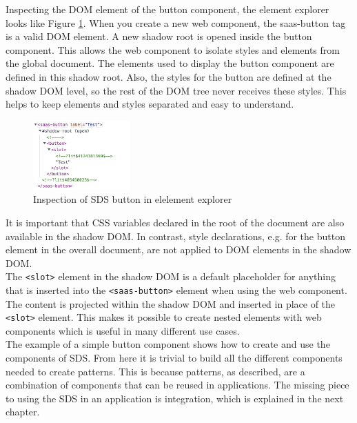 Inspecting the DOM element of the button component, the element explorer looks like Figure \ref{button_element_explorer}. When you create a new web component, the saas-button tag is a valid DOM element. A new shadow root is opened inside the button component. This allows the web component to isolate styles and elements from the global document. The elements used to display the button component are defined in this shadow root. Also, the styles for the button are defined at the shadow DOM level, so the rest of the DOM tree never receives these styles. This helps to keep elements and styles separated and easy to understand. \\
\begin{figure}[htbp]
    \centerline{\includegraphics[height=100px]{images/button_element_explorer.png}}
    \caption{Inspection of SDS button in elelement explorer}
    \label{button_element_explorer}
\end{figure}
It is important that CSS variables declared in the root of the document are also available in the shadow DOM. In contrast, style declarations, e.g. for the button element in the overall document, are not applied to DOM elements in the shadow DOM. \\
The \texttt{<slot>} element in the shadow DOM is a default placeholder for anything that is inserted into the \texttt{<saas-button>} element when using the web component. The content is projected within the shadow DOM and inserted in place of the \texttt{<slot>} element. This makes it possible to create nested elements with web components which is useful in many different use cases. \\

The example of a simple button component shows how to create and use the components of SDS. From here it is trivial to build all the different components needed to create patterns. This is because patterns, as described, are a combination of components that can be reused in applications. The missing piece to using the SDS in an application is integration, which is explained in the next chapter.